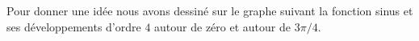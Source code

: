 Pour donner une idée nous avons dessiné sur le graphe suivant la fonction sinus et ses développements d'ordre \( 4\) autour de zéro et autour de \( 3\pi/4\).
\begin{center}
	
\end{center}
